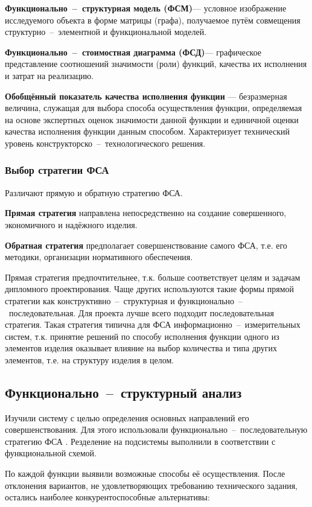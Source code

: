 \textbf{Функционально~--~структурная модель (ФСМ)}--- условное изображение
исследуемого объекта в форме матрицы (графа),
получаемое путём совмещения структурно~--~элементной и функциональной моделей.

\textbf{Функционально~--~стоимостная диаграмма (ФСД)}--- графическое
представление соотношений значимости (роли) функций, качества их
исполнения и затрат на реализацию.

\textbf{Обобщённый показатель качества исполнения функции}
--- безразмерная величина, служащая для выбора способа осуществления функции,
определяемая на основе экспертных оценок значимости данной функции и единичной
оценки качества исполнения функции данным способом.
Характеризует технический уровень конструкторско~--~технологического решения.

\subsubsection{Выбор стратегии ФСА}
Различают прямую и обратную стратегию ФСА.

\textbf{Прямая стратегия}
направлена непосредственно на создание совершенного, экономичного и надёжного
изделия.

\textbf{Обратная стратегия}
предполагает совершенствование самого ФСА, т.е. его методики, организации
нормативного обеспечения.

Прямая стратегия предпочтительнее, т.к. больше соответствует целям и задачам
дипломного проектирования.
Чаще других используются такие формы прямой стратегии как
конструктивно~--~структурная и функционально~--~последовательная.
Для проекта лучше всего подходит последовательная стратегия.
Такая стратегия типична для ФСА информационно~--~измерительных систем, т.к.
принятие решений по способу исполнения функции одного из элементов изделия
оказывает влияние на выбор количества и типа других элементов, т.е. на структуру
изделия в целом.

\newpage
\subsection{Функционально~--~структурный анализ}
Изучили систему с целью определения основных направлений его совершенствования.
Для этого использовали функционально~--~последовательную стратегию ФСА
\cite[стр. 11]{econ_FSA}.
Резделение на подсистемы выполнили в соответствии с функциональной схемой.

По каждой функции выявили возможные способы её осуществления.
После отклонения вариантов, не удовлетворяющих требованию технического
задания, остались наиболее конкурентоспособные альтернативы:

